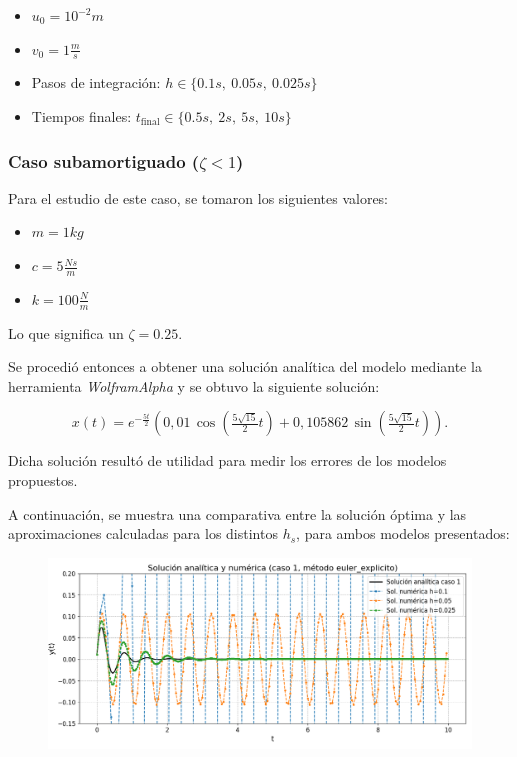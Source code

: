 \documentclass[titlepage,a4paper]{article}
\begin{document}
\begin{itemize}
    \item $u_0 = 10^{-2} {m}$
    \item $v_0 = 1 \frac{m}{s}$
    \item Pasos de integración: $h \in \{0.1s,\ 0.05s,\ 0.025s\} $
    \item Tiempos finales: $t_{\text{final}} \in \{0.5s,\ 2s,\ 5s,\ 10s\}$
\end{itemize}



\subsubsection{Caso subamortiguado (\(\zeta < 1\))}

Para el estudio de este caso, se tomaron los siguientes valores:

\begin{itemize}
    \item \( m = 1kg \)
    \item \( c = 5 \frac{Ns}{m} \)
    \item \( k = 100 \frac{N}{m} \)
\end{itemize}

Lo que significa un $\zeta = 0.25$.



Se procedió entonces a obtener una solución analítica del modelo mediante la herramienta \textit{WolframAlpha} y se obtuvo la siguiente solución:

\[
x(t) = e^{-\frac{5t}{2}} \left(
   0{,}01\,\cos\left(\tfrac{5\sqrt{15}}{2}t\right)
   + 0{,}105862\,\sin\left(\tfrac{5\sqrt{15}}{2}t\right)
\right).
\]

Dicha solución resultó de utilidad para medir los errores de los modelos propuestos.

A continuación, se muestra una comparativa entre la solución óptima y las aproximaciones calculadas para los distintos $h_s$, para ambos modelos presentados:


\begin{figure}[H]
  \centering
  \includegraphics[width=\textwidth]{resultados/comparacion_analitica_aproximada/euler_explicito/z=0.25/caso 1.png}
  \label{fig:euler_subamortiguado}
\end{figure}
\end{document}
